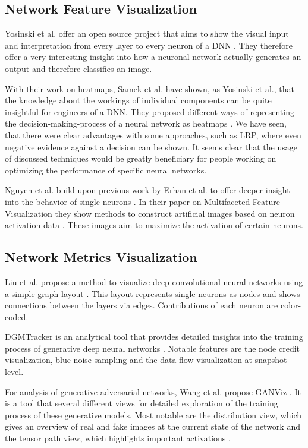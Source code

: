 \documentclass{acmsiggraph}               %
\begin{document}
\subsection{Network Feature Visualization}

Yosinski et al. offer an open source project that aims to show the visual input and interpretation from every layer to every neuron of a DNN \cite{Yosinski2015}. They therefore offer a very interesting insight into how a neuronal network actually generates an output and therefore classifies an image.

With their work on heatmaps, Samek et al. have shown, as Yosinski et al., that the knowledge about the workings of individual components can be quite insightful for engineers of a DNN. They proposed different ways of representing the decision-making-process of a neural network as heatmaps \cite{Samek2017}. We have seen, that there were clear advantages with some approaches, such as LRP, where even negative evidence against a decision can be shown. It seems clear that the usage of discussed techniques would be greatly beneficiary for people working on optimizing the performance of specific neural networks.

Nguyen et al. build upon previous work by Erhan et al. to offer deeper insight into the behavior of single neurons \cite{Nguyen2016,Erhan2009}. In their paper on Multifaceted Feature Visualization they show methods to construct artificial images based on neuron activation data \cite{Nguyen2016}. These images aim to maximize the activation of certain neurons.

\subsection{Network Metrics Visualization}
Liu et al. propose a method to visualize deep convolutional neural networks using a simple graph layout \cite{Liu2016}. This layout represents single neurons as nodes and shows connections between the layers via edges. Contributions of each neuron are color-coded.

DGMTracker is an analytical tool that provides detailed insights into the training process of generative deep neural networks \cite{Liu2018}. Notable features are the node credit visualization, blue-noise sampling and the data flow visualization at snapshot level.

For analysis of generative adversarial networks, Wang et al. propose GANViz \cite{Wang}. It is a tool that several different views for detailed exploration of the training process of these generative models. Most notable are the distribution view, which gives an overview of real and fake images at the current state of the network and the tensor path view, which highlights important activations \cite{Wang}.
\end{document}
